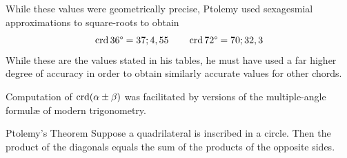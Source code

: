 While these values were geometrically precise, Ptolemy used sexagesmial approximations to square-roots to obtain
\[\crd\ang{36} =37;4,55\qquad \crd\ang{72}=70;32,3\]
While these are the values stated in his tables, he must have used a far higher degree of accuracy in order to obtain similarly accurate values for other chords.
\goodbreak


Computation of $\crd(\alpha\pm\beta)$ was facilitated by versions of the multiple-angle formulæ of modern trigonometry.

\begin{thm*}{Ptolemy's Theorem}{}
Suppose a quadrilateral is inscribed in a circle. Then the product of the diagonals equals the sum of the products of the opposite sides.\footnotemark
\end{thm*}\label{pg:ptolemythm}


